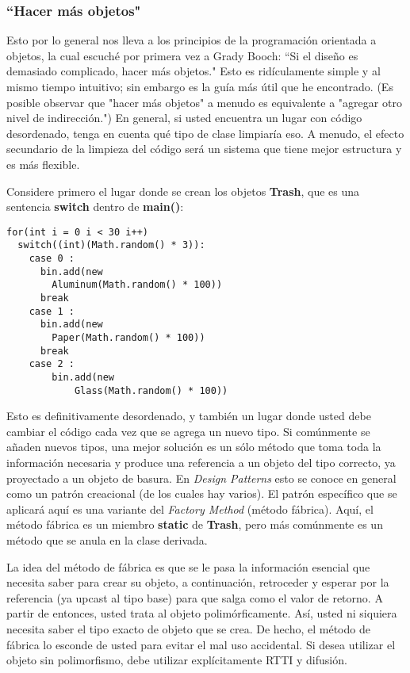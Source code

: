 \subsubsection*{“Hacer más objetos"}
\label{subsubsec:med}


Esto por lo general nos lleva a los principios de la programación orientada a objetos, la cual escuché por primera vez a Grady Booch: “Si el diseño es demasiado complicado, hacer más objetos." Esto es ridículamente simple y al mismo tiempo intuitivo; sin embargo es la guía más útil que he encontrado. (Es posible observar que "hacer más objetos" a menudo es equivalente a "agregar otro nivel de indirección.") En general, si usted encuentra un lugar con código desordenado, tenga en cuenta qué tipo de clase limpiaría eso. A menudo, el efecto secundario de la limpieza del código será un sistema que tiene mejor estructura y es más flexible.    \newline

Considere primero el lugar donde se crean los objetos \textbf{Trash}, que es una sentencia \textbf{switch} dentro de \textbf{main()}:    \newline

\begin{lstlisting} 
for(int i = 0 i < 30 i++) 
  switch((int)(Math.random() * 3)): 
    case 0 : 
      bin.add(new 
        Aluminum(Math.random() * 100)) 
      break 
    case 1 : 
      bin.add(new 
        Paper(Math.random() * 100)) 
      break 
    case 2 : 
        bin.add(new 
            Glass(Math.random() * 100)) 
\end{lstlisting}

Esto es definitivamente desordenado, y también un lugar donde usted debe cambiar el código cada vez que se agrega un nuevo tipo. Si comúnmente se añaden nuevos tipos, una mejor solución es un sólo método que toma toda la información necesaria y produce una referencia a un objeto del tipo correcto, ya proyectado a un objeto de basura. En \textit{Design Patterns} esto se conoce en general como un patrón creacional (de los cuales hay varios). El patrón específico que se aplicará aquí es una variante del \textit{Factory Method} (método fábrica). Aquí, el método fábrica es un miembro \textbf{static} de \textbf{Trash}, pero más comúnmente es un método que se anula en la clase derivada.  \newline

La idea del método de fábrica es que se le pasa la información esencial que necesita saber para crear su objeto, a continuación, retroceder y esperar por la referencia (ya upcast al tipo base) para que salga como el valor de retorno.  A partir de entonces, usted trata al objeto polimórficamente. Así, usted ni siquiera necesita saber el tipo exacto de objeto que se crea. De hecho, el método de fábrica lo esconde de usted para evitar el mal uso accidental. Si desea utilizar el objeto sin polimorfismo, debe utilizar explícitamente RTTI y difusión.    \newline

